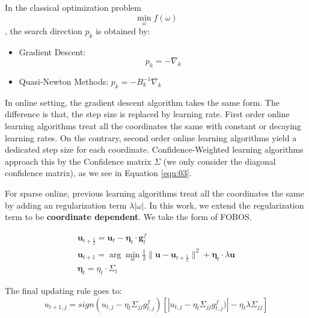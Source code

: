 \documentclass{article}
\begin{document}
In the classical optimization problem $$\min_{\omega}f(\omega)$$, the
search direction $p_k$ is obtained by:
\begin{itemize}
  \item Gradient Descent: $$p_k = -\nabla_k$$
  \item Quasi-Newton Methods: $p_k = -B_k^{-1}\nabla_k$
\end{itemize}

In online setting, the gradient descent algorithm takes the same form.
The difference is that, the step size is replaced by learning rate.
First order online learning algorithms treat all the coordinates the
same with constant or decaying learning rates. On the contrary, second
order online learning algorithms yield a dedicated step size for each
coordinate. Confidence-Weighted learning algorithms approach this by
the Confidence matrix $\Sigma$ (we only consider the diagonal
confidence matrix), as we see in Equation \ref{equ:03}.

For sparse online, previous learning algorithms treat all the
coordinates the same by adding an regularization term
$\lambda|\omega|$. In this work, we extend the regularization term to
be \textbf{coordinate dependent}. We take the form of FOBOS.

\begin{equation}
  \begin{aligned}
    \bm{u}_{t+\frac{1}{2}} = \bm{u}_t - \bm{\eta}_t\cdot\bm{g}_t^f \\
    \bm{u}_{t+1} = \arg\min_w{\frac{1}{2}\|\bm{u} -
    \bm{u}_{t+\frac{1}{2}}\|^2 + \bm{\eta}_{t}\cdot\lambda\bm{u}} \\
    \bm{\eta}_t = \eta_t\cdot\Sigma_t
  \end{aligned}
  \label{equ:04}
\end{equation}

The final updating rule goes to:
\begin{equation}
  u_{t+1,j} = sign(u_{t,j} - \eta_t\Sigma_{jj}g_{t,j}^f)
  [|u_{t,j} - \eta_t\Sigma_{jj}g_{t,j}^f)| - \eta_t\lambda\Sigma_{jj}]
  \label{equ:05}
\end{equation}
\end{document}
